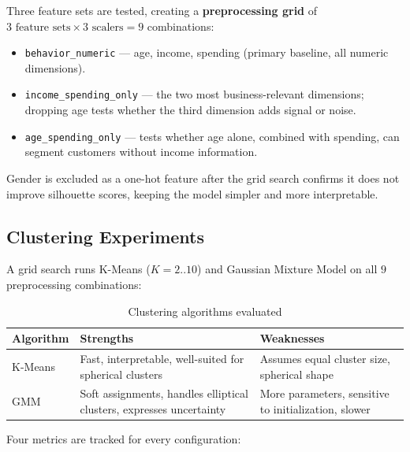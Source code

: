Three feature sets are tested, creating a \textbf{preprocessing grid} of $3 \text{ feature sets} \times 3 \text{ scalers} = 9$ combinations:
\begin{itemize}
  \item \texttt{behavior\_numeric} --- age, income, spending (primary baseline, all numeric dimensions).
  \item \texttt{income\_spending\_only} --- the two most business-relevant dimensions; dropping age tests whether the third dimension adds signal or noise.
  \item \texttt{age\_spending\_only} --- tests whether age alone, combined with spending, can segment customers without income information.
\end{itemize}

Gender is excluded as a one-hot feature after the grid search confirms it does not improve silhouette scores, keeping the model simpler and more interpretable.

\subsection{Clustering Experiments}

A grid search runs K-Means ($K=2..10$) and Gaussian Mixture Model on all $9$ preprocessing combinations:

\begin{table}[H]
\centering{}
\begin{tabular}{l L{5cm} L{5cm}}
\toprule{}\color{white}\textbf{Algorithm} &\color{white}\textbf{Strengths} &\color{white}\textbf{Weaknesses}\\
\midrule
K-Means & Fast, interpretable, well-suited for spherical clusters & Assumes equal cluster size, spherical shape\\
GMM & Soft assignments, handles elliptical clusters, expresses uncertainty & More parameters, sensitive to initialization, slower\\
\bottomrule
\end{tabular}
\caption{Clustering algorithms evaluated}
\end{table}

Four metrics are tracked for every configuration:

